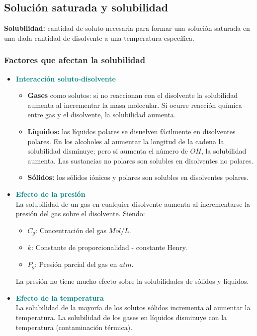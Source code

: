     \subsection{Solución saturada y solubilidad}
        \sangria{} \textbf{Solubilidad:} cantidad de soluto necesaria para formar una solución saturada en una dada cantidad de disolvente a una temperatura específica.
        \subsubsection{Factores que afectan la solubilidad}
        \begin{itemize}
            \item \textcolor{teal}{\textbf{Interacción soluto-disolvente}}
            \begin{itemize}
                \item \textbf{Gases} como solutos: si no reaccionan con el disolvente la solubilidad aumenta al incrementar la masa molecular. Si ocurre reacción química entre gas y el disolvente, la solubilidad aumenta.
                \item \textbf{Líquidos:} los líquidos polares se disuelven fácilmente en disolventes polares. En los alcoholes al aumentar la longitud de la cadena la solubilidad disminuye; pero si aumenta el número de $OH$, la solubilidad aumenta.
                    Las sustancias no polares son solubles en disolventes no polares.
                \item \textbf{Sólidos:} los sólidos iónicos y polares son solubles en disolventes polares.
            \end{itemize}
            \item \textcolor{teal}{\textbf{Efecto de la presión}} \\
                \sangria{} La solubilidad de un gas en cualquier disolvente aumenta al incrementarse la presión del gas sobre el disolvente.
                Siendo:
                \begin{itemize}
                    \item $C_g$: Concentración del gas $Mol/L$.
                    \item $k$: Constante de proporcionalidad - constante Henry.
                    \item $P_g$: Presión parcial del gas en $atm$.
                \end{itemize}
                \sangria{} La presión no tiene mucho efecto sobre la solubilidades de sólidos y líquidos.
            \item \textcolor{teal}{\textbf{Efecto de la temperatura}} \\
            \sangria{} La solubilidad de la mayoría de los solutos sólidos incrementa al aumentar la temperatura.
            \sangria{} La solubilidad de los gases en líquidos disminuye con la temperatura (contaminación térmica).
        \end{itemize}
